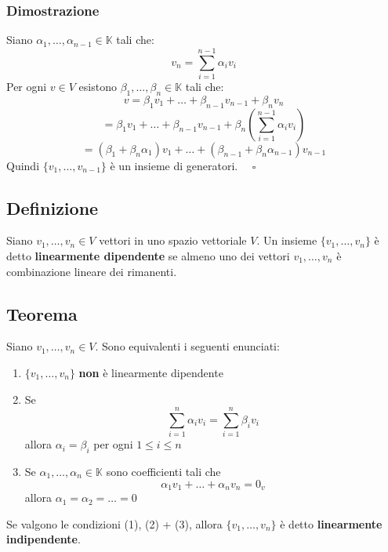 \documentclass[a4paper]{article}
\theoremstyle{break}
\theoremstyle{break}
\theoremstyle{break}
\theoremstyle{break}
\begin{document}
\subsubsection{Dimostrazione}
Siano \( \alpha_1, \ldots, \alpha_{n-1} \in \mathbb{K} \) tali che:
\[
v_n = \sum_{i=1}^{n-1} \alpha_i v_i
\] 
Per ogni \( v \in V \) esistono \( \beta_1, \ldots, \beta_n \in \mathbb{K} \) tali che:
\[
  v = \beta_1 v_1 + \ldots + \beta_{n-1} v_{n-1} + \beta_n v_n
\] 
\[
  = \beta_1 v_1 + \ldots + \beta_{n-1} v_{n-1} + \beta_n \left(\sum_{i=1}^{n-1} \alpha_i v_i\right)
\] 
\[
 = (\beta_1 + \beta_n \alpha_1) v_1 + \ldots + (\beta_{n-1} + \beta_n \alpha_{n-1}) v_{n-1}
\] 
Quindi \( \{v_1, \ldots, v_{n-1}\}  \) è un insieme di generatori. \( \quad \square \)

\subsection{Definizione}
Siano \( v_1, \ldots, v_n \in V \) vettori in uno spazio vettoriale \( V \). 
Un insieme
\( \{v_1, \ldots, v_n\}  \) è detto \textbf{linearmente dipendente} se almeno uno dei
vettori \( v_1, \ldots, v_n \) è combinazione lineare dei rimanenti.

\subsection{Teorema}
Siano \( v_1, \ldots, v_n \in V \). Sono equivalenti i seguenti enunciati:
\begin{enumerate}
  \item \( \{v_1, \ldots, v_n\}  \) \textbf{non} è linearmente dipendente
  \item Se \[ \sum_{i=1}^n \alpha_i v_i = \sum_{i=1}^n \beta_i v_i \] allora 
    \( \alpha_i = \beta_i \) per ogni \( 1 \le i \le n \)
  \item Se \( \alpha_1, \ldots, \alpha_n \in \mathbb{K} \) sono coefficienti tali che
    \[
    \alpha_1 v_1 + \ldots + \alpha_n v_n = 0_v
    \] 
    allora \( \alpha_1 = \alpha_2 = \ldots = 0 \) 
\end{enumerate}
Se valgono le condizioni (1), (2) + (3), allora \( \{v_1, \ldots, v_n\}  \) è detto
\textbf{linearmente indipendente}.
\end{document}

